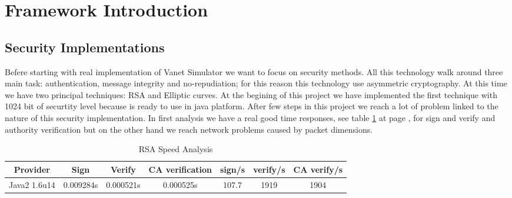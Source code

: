 \section{Framework Introduction}
\subsection{Security Implementations}
Befere starting with real implementation of Vanet Simulator we want to focus on security methods. All this technology walk around three main task: authentication, message integrity and no-repudiation; for this reason this technology use asymmetric cryptography. At this time we have two principal techniques: RSA and Elliptic curves. At the begining of this project we have implemented the first technique with 1024 bit of securtity level because is ready to use in java platform. After few steps in this project we reach a lot of problem linked to the nature of this security implementation. In first analysis we have a real good time responses, see table \ref{tab:RSAVelocity} at page \pageref{tab:RSAVelocity}, for sign and verify and authority verification but on the other hand we reach network problems caused by packet dimensions.
\begin{table}[!ht]
	\centering
	\caption{RSA Speed Analysis}
	\begin{tabular}{|c|c|c|c|c|c|c|}
	\hline\hline 
	\textbf{Provider} & \textbf{Sign} & \textbf{Verify} & \textbf{CA verification} & \textbf{sign/s} & \textbf{verify/s}  & \textbf{CA verify/s}\\
	\hline
	Java2 1.6u14 & 0.009284s & 0.000521s & 0.000525s & 107.7 & 1919 & 1904 \\
	\hline
	\hline     %
 	\end{tabular} 
	\label{tab:RSAVelocity}
\end{table}

